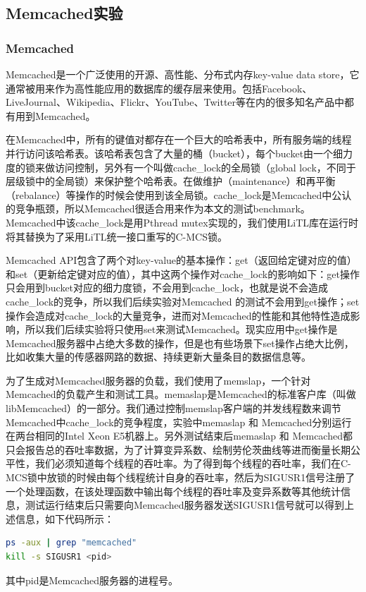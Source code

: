\subsection{Memcached实验}
\subsubsection{Memcached}
Memcached是一个广泛使用的开源、高性能、分布式内存key-value data store，它通常被用来作为高性能应用的数据库的缓存层来使用。包括Facebook、LiveJournal、Wikipedia、Flickr、YouTube、Twitter等在内的很多知名产品中都有用到Memcached。

在Memcached中，所有的键值对都存在一个巨大的哈希表中，所有服务端的线程并行访问该哈希表。该哈希表包含了大量的桶（bucket），每个bucket由一个细力度的锁来做访问控制，另外有一个叫做cache\_lock的全局锁（global lock，不同于层级锁中的全局锁）来保护整个哈希表。在做维护（maintenance）和再平衡（rebalance）等操作的时候会使用到该全局锁。cache\_lock是Memcached中公认的竞争瓶颈\cite{pohlack2011lightweight}，所以Memcached很适合用来作为本文的测试benchmark。Memcached中该cache\_lock是用Pthread mutex实现的，我们使用LiTL库在运行时将其替换为了采用LiTL统一接口重写的C-MCS锁。

Memcached API包含了两个对key-value的基本操作：get（返回给定键对应的值）和set（更新给定键对应的值），其中这两个操作对cache\_lock的影响如下：get操作只会用到bucket对应的细力度锁，不会用到cache\_lock，也就是说不会造成cache\_lock的竞争，所以我们后续实验对Memcached 的测试不会用到get操作；set操作会造成对cache\_lock的大量竞争，进而对Memcached的性能和其他特性造成影响，所以我们后续实验将只使用set来测试Memcached。现实应用中get操作是Memcached服务器中占绝大多数的操作，但是也有些场景下set操作占绝大比例，比如收集大量的传感器网路的数据、持续更新大量条目的数据信息等\cite{dice2012lock}。

为了生成对Memcached服务器的负载，我们使用了memslap，一个针对Memcached的负载产生和测试工具。memaslap是Memcached的标准客户库（叫做libMemcached\cite{libmemcached}）的一部分。我们通过控制memslap客户端的并发线程数来调节Memcached中cache\_lock的竞争程度，实验中memaslap 和 Memcached分别运行在两台相同的Intel Xeon E5机器上。另外测试结束后memaslap 和 Memcached都只会报告总的吞吐率数据，为了计算变异系数、绘制劳伦茨曲线等进而衡量长期公平性，我们必须知道每个线程的吞吐率。为了得到每个线程的吞吐率，我们在C-MCS锁中放锁的时候由每个线程统计自身的吞吐率，然后为SIGUSR1信号注册了一个处理函数，在该处理函数中输出每个线程的吞吐率及变异系数等其他统计信息，测试运行结束后只需要向Memcached服务器发送SIGUSR1信号就可以得到上述信息，如下代码所示：
\begin{lstlisting}[language={Bash}, caption={获取Memcached每个线程的吞吐率及其他统计信息}]
ps -aux | grep "memcached"
kill -s SIGUSR1 <pid>
\end{lstlisting}
其中pid是Memcached服务器的进程号。

